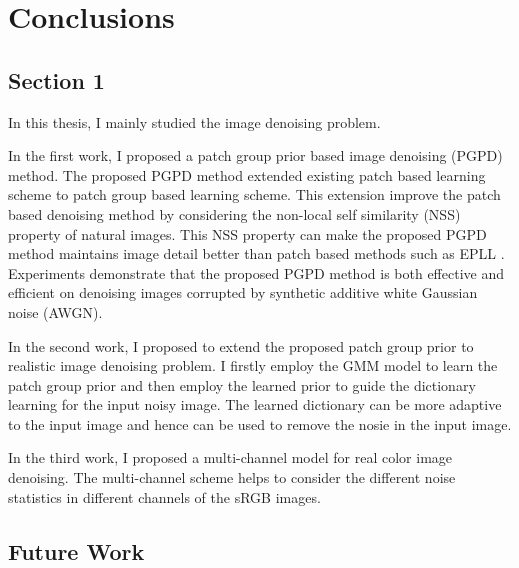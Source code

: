 %
\chapter{Conclusions}
\label{sec:conclusions}


\section{Section 1}
\label{sec:conclusions:sec1}
In this thesis, I mainly studied the image denoising problem. 

In the first work, I proposed a patch group prior based image denoising (PGPD) method. The proposed PGPD method extended existing patch based learning scheme to patch group based learning scheme. This extension improve the patch based denoising method by considering the non-local self similarity (NSS) property of natural images. This NSS property can make the proposed PGPD method maintains image detail better than patch based methods such as EPLL \cite{epll}. Experiments demonstrate that the proposed PGPD method is both effective and efficient on denoising images corrupted by synthetic additive white Gaussian noise (AWGN).

In the second work, I proposed to extend the proposed patch group prior to realistic image denoising problem. I firstly employ the GMM model to learn the patch group prior and then employ the learned prior to guide the dictionary learning for the input noisy image. The learned dictionary can be more adaptive to the input image and hence can be used to remove the nosie in the input image.

In the third work, I proposed a multi-channel model for real color image denoising. The multi-channel scheme helps to consider the different noise statistics in different channels of the sRGB images.





\section{Future Work}
\label{sec:conclusions:future}

